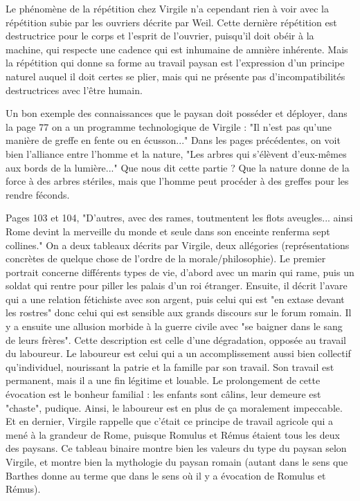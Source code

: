 \documentclass[a4paper,12pt]{book}
\begin{document}
\par Le phénomène de la répétition chez Virgile n'a cependant rien à voir avec la répétition subie par les ouvriers décrite par Weil. Cette dernière répétition est destructrice pour le corps et l'esprit de l'ouvrier, puisqu'il doit obéir à la machine, qui respecte une cadence qui est inhumaine de amnière inhérente. Mais la répétition qui donne sa forme au travail paysan est l'expression d'un principe naturel auquel il doit certes se plier, mais qui ne présente pas d'incompatibilités destructrices avec l'être humain.
\par Un bon exemple des connaissances que le paysan doit posséder et déployer, dans la page 77 on a un programme technologique de Virgile : "Il n'est pas qu'une manière de greffe en fente ou en écusson..." Dans les pages précédentes, on voit bien l'alliance entre l'homme et la nature, "Les arbres qui s'élèvent d'eux-mêmes aux bords de la lumière..." Que nous dit cette partie ? Que la nature donne de la force à des arbres stériles, mais que l'homme peut procéder à des greffes pour les rendre féconds.
\par Pages 103 et 104, "D'autres, avec des rames, toutmentent les flots aveugles... ainsi Rome devint la merveille du monde et seule dans son enceinte renferma sept collines." On a deux tableaux décrits par Virgile, deux allégories (représentations concrètes de quelque chose de l'ordre de la morale/philosophie). Le premier portrait concerne différents types de vie, d'abord avec un marin qui rame, puis un soldat qui rentre pour piller les palais d'un roi étranger. Ensuite, il décrit l'avare qui a une relation fétichiste avec son argent, puis celui qui est "en extase devant les rostres" donc celui qui est sensible aux grands discours sur le forum romain. Il y a ensuite une allusion morbide à la guerre civile avec "se baigner dans le sang de leurs frères". Cette description est celle d'une dégradation, opposée au travail du laboureur. Le laboureur est celui qui a un accomplissement aussi bien collectif qu'individuel, nourissant la patrie et la famille par son travail. Son travail est permanent, mais il a une fin légitime et louable. Le prolongement de cette évocation est le bonheur familial : les enfants sont câlins, leur demeure est "chaste", pudique. Ainsi, le laboureur est en plus de ça moralement impeccable. Et en dernier, Virgile rappelle que c'était ce principe de travail agricole qui a mené à la grandeur de Rome, puisque Romulus et Rémus étaient tous les deux des paysans. Ce tableau binaire montre bien les valeurs du type du paysan selon Virgile, et montre bien la mythologie du paysan romain (autant dans le sens que Barthes donne au terme que dans le sens où il y a évocation de Romulus et Rémus).
\end{document}
